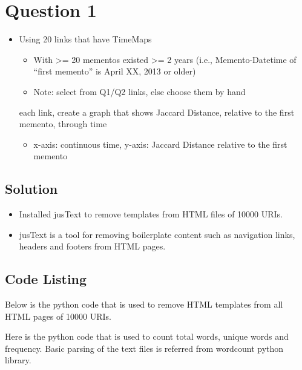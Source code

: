 


\section{Question 1}
\label{part1}

\begin{itemize}
\item Using 20 links that have TimeMaps
\begin{itemize}
\item With >= 20 mementos
\itemHave existed >= 2 years (i.e., Memento-Datetime of “first memento” is April XX, 2013 or older)
\item Note: select from Q1/Q2 links, else choose them by hand
\end{itemize}
\itemFor each link, create a graph that shows Jaccard Distance, relative to the first memento, through time
\begin{itemize}
\item x-axis: continuous time, y-axis: Jaccard Distance relative to the first memento
\end{itemize}
\end{itemize}
\subsection{Solution}

\begin{itemize}
	\item Installed jusText\cite{jusText} to remove templates from HTML files of 10000 URIs.
	\item jusText is a tool for removing boilerplate content such as navigation links, headers and footers from HTML pages.
\end{itemize}

 \subsection{Code Listing}
Below is the python code that is used to remove HTML templates from all HTML pages of 10000 URIs.



Here is the python code that is used to count total words, unique words and frequency. Basic parsing of the text files
is referred from wordcount python library\cite{Wordcount}.

